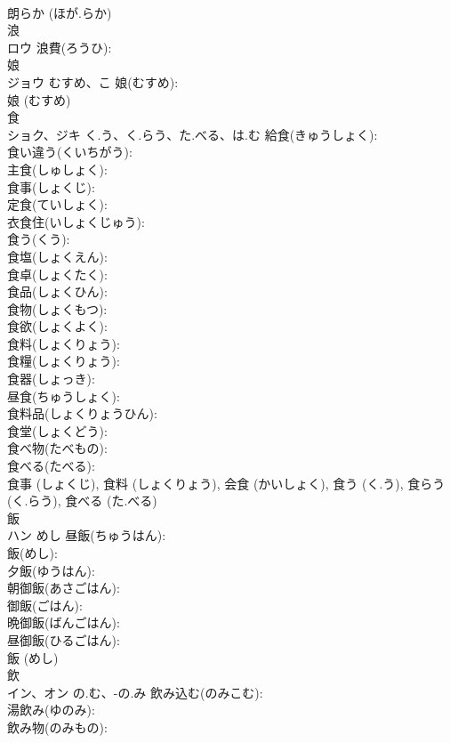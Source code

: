 \documentclass[8pt]{extreport}
\begin{document}
\begin{CJK}{UTF8}{min}
\\	朗らか (ほが.らか)
\\	浪			
\\	ロウ		浪費(ろうひ): 
\\	娘			
\\	ジョウ	むすめ、こ	娘(むすめ): 
\\	娘 (むすめ)
\\	食			
\\	ショク、ジキ	く.う、く.らう、た.べる、は.む	給食(きゅうしょく): 
\\	食い違う(くいちがう): 
\\	主食(しゅしょく): 
\\	食事(しょくじ): 
\\	定食(ていしょく): 
\\	衣食住(いしょくじゅう): 
\\	食う(くう): 
\\	食塩(しょくえん): 
\\	食卓(しょくたく): 
\\	食品(しょくひん): 
\\	食物(しょくもつ): 
\\	食欲(しょくよく): 
\\	食料(しょくりょう): 
\\	食糧(しょくりょう): 
\\	食器(しょっき): 
\\	昼食(ちゅうしょく): 
\\	食料品(しょくりょうひん): 
\\	食堂(しょくどう): 
\\	食べ物(たべもの): 
\\	食べる(たべる): 
\\	食事 (しょくじ), 食料 (しょくりょう), 会食 (かいしょく), 食う (く.う), 食らう (く.らう), 食べる (た.べる)
\\	飯			
\\	ハン	めし	昼飯(ちゅうはん): 
\\	飯(めし): 
\\	夕飯(ゆうはん): 
\\	朝御飯(あさごはん): 
\\	御飯(ごはん): 
\\	晩御飯(ばんごはん): 
\\	昼御飯(ひるごはん): 
\\	飯 (めし)
\\	飲			
\\	イン、オン	の.む、-の.み	飲み込む(のみこむ): 
\\	湯飲み(ゆのみ): 
\\	飲み物(のみもの): 

\end{CJK}
\end{document}

